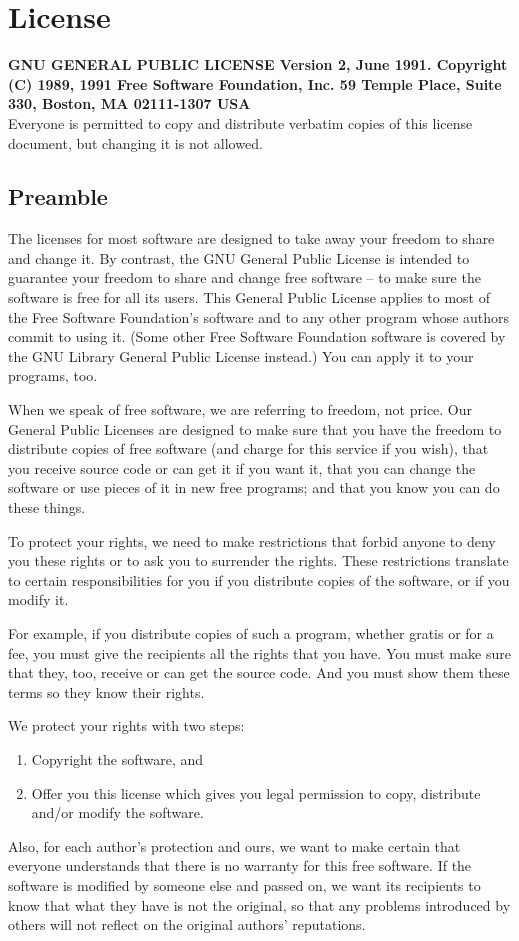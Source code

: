 \documentclass[oneside,english]{book}
\begin{document}
\chapter{\label{cha:License}License}

\textbf{GNU GENERAL PUBLIC LICENSE Version 2, June 1991. Copyright
(C) 1989, 1991 Free Software Foundation, Inc. 59 Temple Place, Suite
330, Boston, MA 02111-1307 USA} \\
Everyone is permitted to copy and distribute verbatim copies of this
license document, but changing it is not allowed.


\section*{Preamble}

The licenses for most software are designed to take away your freedom
to share and change it. By contrast, the GNU General Public License
is intended to guarantee your freedom to share and change free software
-- to make sure the software is free for all its users. This General
Public License applies to most of the Free Software Foundation's software
and to any other program whose authors commit to using it. (Some other
Free Software Foundation software is covered by the GNU Library General
Public License instead.) You can apply it to your programs, too.

When we speak of free software, we are referring to freedom, not price.
Our General Public Licenses are designed to make sure that you have
the freedom to distribute copies of free software (and charge for
this service if you wish), that you receive source code or can get
it if you want it, that you can change the software or use pieces
of it in new free programs; and that you know you can do these things.

To protect your rights, we need to make restrictions that forbid anyone
to deny you these rights or to ask you to surrender the rights. These
restrictions translate to certain responsibilities for you if you
distribute copies of the software, or if you modify it.

For example, if you distribute copies of such a program, whether gratis
or for a fee, you must give the recipients all the rights that you
have. You must make sure that they, too, receive or can get the source
code. And you must show them these terms so they know their rights.

We protect your rights with two steps:

\begin{enumerate}
\item Copyright the software, and
\item Offer you this license which gives you legal permission to copy, distribute
and/or modify the software.
\end{enumerate}
Also, for each author's protection and ours, we want to make certain
that everyone understands that there is no warranty for this free
software. If the software is modified by someone else and passed on,
we want its recipients to know that what they have is not the original,
so that any problems introduced by others will not reflect on the
original authors' reputations.
\end{document}

